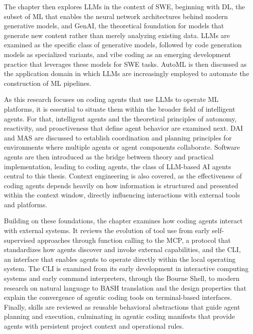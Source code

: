 \documentclass[
english,                 %
bibtex,                  %
includeExtraAbstracts, %
]{kththesis}
\numberwithin{listing}{chapter}
\begin{document}
The chapter then explores \glspl{LLM} in the context of \gls{SWE}, beginning with \gls{DL}, the subset of \gls{ML} that enables the neural network architectures behind modern generative models, and \gls{GenAI}, the theoretical foundation for models that generate new content rather than merely analyzing existing data. \Glspl{LLM} are examined as the specific class of generative models, followed by code generation models as specialized variants, and vibe coding as an emerging development practice that leverages these models for \gls{SWE} tasks. \Gls{AutoML} is then discussed as the application domain in which \glspl{LLM} are increasingly employed to automate the construction of \gls{ML} pipelines.

As this research focuses on coding agents that use \glspl{LLM} to operate \gls{ML} platforms, it is essential to situate them within the broader field of intelligent agents. For that, intelligent agents and the theoretical principles of autonomy, reactivity, and proactiveness that define agent behavior are examined next. \Gls{DAI} and \gls{MAS} are discussed to establish coordination and planning principles for environments where multiple agents or agent components collaborate. Software agents are then introduced as the bridge between theory and practical implementation, leading to coding agents, the class of \gls{LLM}-based \gls{AI} agents central to this thesis. Context engineering is also covered, as the effectiveness of coding agents depends heavily on how information is structured and presented within the context window, directly influencing interactions with external tools and platforms.

Building on these foundations, the chapter examines how coding agents interact with external systems. It reviews the evolution of tool use from early self-supervised approaches through function calling to the \gls{MCP}, a protocol that standardizes how agents discover and invoke external capabilities, and the \gls{CLI}, an interface that enables agents to operate directly within the local operating system. The \gls{CLI} is examined from its early development in interactive computing systems and early command interpreters, through the Bourne Shell, to modern research on natural language to \gls{BASH} translation and the design properties that explain the convergence of agentic coding tools on terminal-based interfaces. Finally, skills are reviewed as reusable behavioral abstractions that guide agent planning and execution, culminating in agentic coding manifests that provide agents with persistent project context and operational rules.
\end{document}
